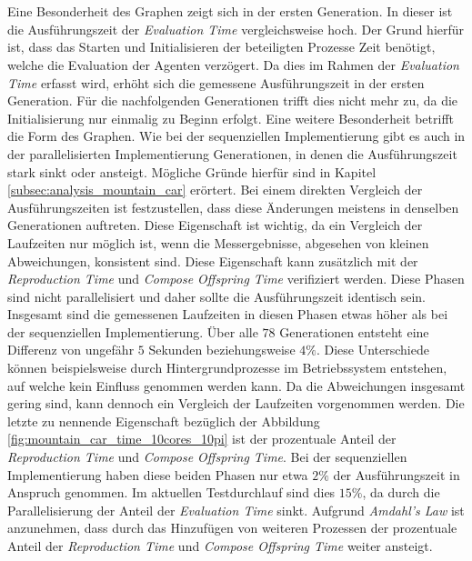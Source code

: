 \\\\
Eine Besonderheit des Graphen zeigt sich in der ersten Generation. In dieser ist die Ausführungszeit der \emph{Evaluation Time} vergleichsweise hoch. Der Grund hierfür ist, dass das Starten und Initialisieren der beteiligten Prozesse Zeit benötigt, welche die Evaluation der Agenten verzögert. Da dies im Rahmen der \emph{Evaluation Time} erfasst wird, erhöht sich die gemessene Ausführungszeit in der ersten Generation. Für die nachfolgenden Generationen trifft dies nicht mehr zu, da die Initialisierung nur einmalig zu Beginn erfolgt. Eine weitere Besonderheit betrifft die Form des Graphen. Wie bei der sequenziellen Implementierung gibt es auch in der parallelisierten Implementierung Generationen, in denen die Ausführungszeit stark sinkt oder ansteigt. Mögliche Gründe hierfür sind in Kapitel \ref{subsec:analysis_mountain_car} erörtert. Bei einem direkten Vergleich der Ausführungszeiten ist festzustellen, dass diese Änderungen meistens in denselben Generationen auftreten. Diese Eigenschaft ist wichtig, da ein Vergleich der Laufzeiten nur möglich ist, wenn die Messergebnisse, abgesehen von kleinen Abweichungen, konsistent sind. Diese Eigenschaft kann zusätzlich mit der \emph{Reproduction Time} und \emph{Compose Offspring Time} verifiziert werden. Diese Phasen sind nicht parallelisiert und daher sollte die Ausführungszeit identisch sein. Insgesamt sind die gemessenen Laufzeiten in diesen Phasen etwas höher als bei der sequenziellen Implementierung. Über alle $78$ Generationen entsteht eine Differenz von ungefähr $5$ Sekunden beziehungsweise $4\%$. Diese Unterschiede können beispielsweise durch Hintergrundprozesse im Betriebssystem entstehen, auf welche kein Einfluss genommen werden kann. Da die Abweichungen insgesamt gering sind, kann dennoch ein Vergleich der Laufzeiten vorgenommen werden. Die letzte zu nennende Eigenschaft bezüglich der Abbildung \ref{fig:mountain_car_time_10cores_10pi} ist der prozentuale Anteil der \emph{Reproduction Time} und \emph{Compose Offspring Time}. Bei der sequenziellen Implementierung haben diese beiden Phasen nur etwa $2\%$ der Ausführungszeit in Anspruch genommen. Im aktuellen Testdurchlauf sind dies $15\%$, da durch die Parallelisierung der Anteil der \emph{Evaluation Time} sinkt. Aufgrund \emph{Amdahl's Law} ist anzunehmen, dass durch das Hinzufügen von weiteren Prozessen der prozentuale Anteil der \emph{Reproduction Time} und \emph{Compose Offspring Time} weiter ansteigt.
